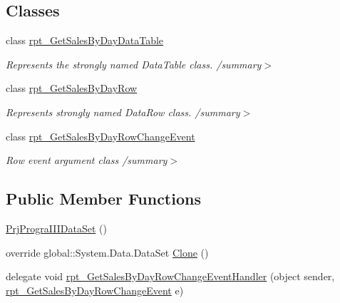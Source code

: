 \subsection*{Classes}
\begin{DoxyCompactItemize}
\item 
class \hyperlink{classprj_progra_i_i_i_1_1_prj_progra_i_i_i_data_set_1_1rpt___get_sales_by_day_data_table}{rpt\+\_\+\+Get\+Sales\+By\+Day\+Data\+Table}
\begin{DoxyCompactList}\small\item\em Represents the strongly named Data\+Table class. /summary$>$ \end{DoxyCompactList}\item 
class \hyperlink{classprj_progra_i_i_i_1_1_prj_progra_i_i_i_data_set_1_1rpt___get_sales_by_day_row}{rpt\+\_\+\+Get\+Sales\+By\+Day\+Row}
\begin{DoxyCompactList}\small\item\em Represents strongly named Data\+Row class. /summary$>$ \end{DoxyCompactList}\item 
class \hyperlink{classprj_progra_i_i_i_1_1_prj_progra_i_i_i_data_set_1_1rpt___get_sales_by_day_row_change_event}{rpt\+\_\+\+Get\+Sales\+By\+Day\+Row\+Change\+Event}
\begin{DoxyCompactList}\small\item\em Row event argument class /summary$>$ \end{DoxyCompactList}\end{DoxyCompactItemize}
\subsection*{Public Member Functions}
\begin{DoxyCompactItemize}
\item 
\hyperlink{classprj_progra_i_i_i_1_1_prj_progra_i_i_i_data_set_a6f9d23a27fd935aa75948728c44e0ab7}{Prj\+Progra\+I\+I\+I\+Data\+Set} ()
\item 
override global\+::\+System.\+Data.\+Data\+Set \hyperlink{classprj_progra_i_i_i_1_1_prj_progra_i_i_i_data_set_a22cbde87872ac11969e769cbc3a70d21}{Clone} ()
\item 
delegate void \hyperlink{classprj_progra_i_i_i_1_1_prj_progra_i_i_i_data_set_aa1d46bd3c23f7f4fb63afc2bdb363a5b}{rpt\+\_\+\+Get\+Sales\+By\+Day\+Row\+Change\+Event\+Handler} (object sender, \hyperlink{classprj_progra_i_i_i_1_1_prj_progra_i_i_i_data_set_1_1rpt___get_sales_by_day_row_change_event}{rpt\+\_\+\+Get\+Sales\+By\+Day\+Row\+Change\+Event} e)
\end{DoxyCompactItemize}
